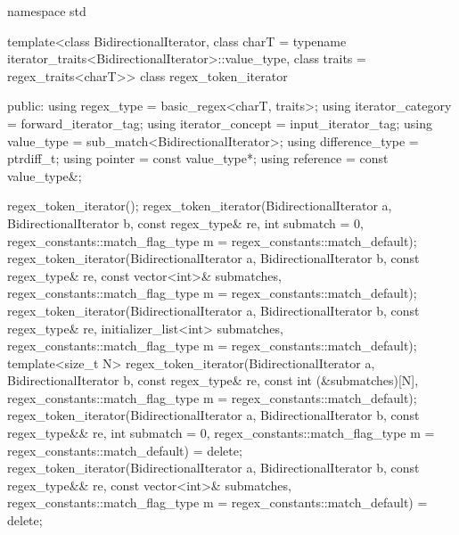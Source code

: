 \begin{codeblock}
namespace std {
  template<class BidirectionalIterator,
            class charT = typename iterator_traits<BidirectionalIterator>::value_type,
            class traits = regex_traits<charT>>
    class regex_token_iterator {
    public:
      using regex_type        = basic_regex<charT, traits>;
      using iterator_category = forward_iterator_tag;
      using iterator_concept  = input_iterator_tag;
      using value_type        = sub_match<BidirectionalIterator>;
      using difference_type   = ptrdiff_t;
      using pointer           = const value_type*;
      using reference         = const value_type&;

      regex_token_iterator();
      regex_token_iterator(BidirectionalIterator a, BidirectionalIterator b,
                           const regex_type& re,
                           int submatch = 0,
                           regex_constants::match_flag_type m =
                             regex_constants::match_default);
      regex_token_iterator(BidirectionalIterator a, BidirectionalIterator b,
                           const regex_type& re,
                           const vector<int>& submatches,
                           regex_constants::match_flag_type m =
                             regex_constants::match_default);
      regex_token_iterator(BidirectionalIterator a, BidirectionalIterator b,
                           const regex_type& re,
                           initializer_list<int> submatches,
                           regex_constants::match_flag_type m =
                             regex_constants::match_default);
      template<size_t N>
        regex_token_iterator(BidirectionalIterator a, BidirectionalIterator b,
                             const regex_type& re,
                             const int (&submatches)[N],
                             regex_constants::match_flag_type m =
                               regex_constants::match_default);
      regex_token_iterator(BidirectionalIterator a, BidirectionalIterator b,
                           const regex_type&& re,
                           int submatch = 0,
                           regex_constants::match_flag_type m =
                             regex_constants::match_default) = delete;
      regex_token_iterator(BidirectionalIterator a, BidirectionalIterator b,
                           const regex_type&& re,
                           const vector<int>& submatches,
                           regex_constants::match_flag_type m =
                             regex_constants::match_default) = delete;
}}
\end{codeblock}
